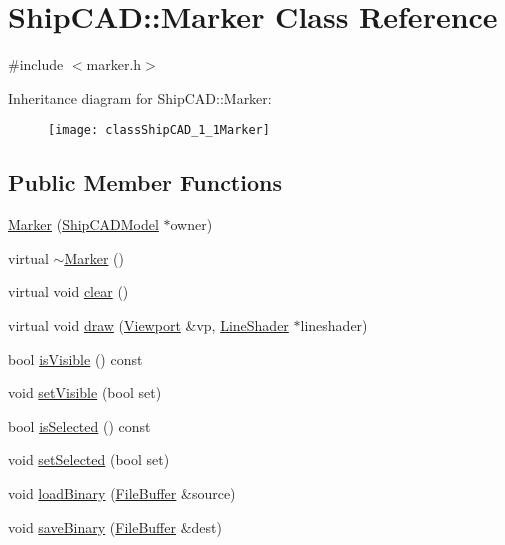 \hypertarget{classShipCAD_1_1Marker}{}\section{Ship\+C\+AD\+:\+:Marker Class Reference}
\label{classShipCAD_1_1Marker}


{\ttfamily \#include $<$marker.\+h$>$}

Inheritance diagram for Ship\+C\+AD\+:\+:Marker\+:\begin{figure}[H]
\begin{center}
\leavevmode
\texttt{[image: classShipCAD\_1\_1Marker]}
\end{center}
\end{figure}
\subsection*{Public Member Functions}
\begin{DoxyCompactItemize}
\item 
\hyperlink{classShipCAD_1_1Marker_a216cf592a0945f6b6923a00c9625e3bf}{Marker} (\hyperlink{classShipCAD_1_1ShipCADModel}{Ship\+C\+A\+D\+Model} $\ast$owner)
\item 
virtual \hyperlink{classShipCAD_1_1Marker_a2f3196a90d442386b0d50f54b69e6116}{$\sim$\+Marker} ()
\item 
virtual void \hyperlink{classShipCAD_1_1Marker_ac7c7eea8648562f3fa00a9e10af6ec97}{clear} ()
\item 
virtual void \hyperlink{classShipCAD_1_1Marker_a0cca647d9b32dc69b03903b024dc3091}{draw} (\hyperlink{classShipCAD_1_1Viewport}{Viewport} \&vp, \hyperlink{classShipCAD_1_1LineShader}{Line\+Shader} $\ast$lineshader)
\item 
bool \hyperlink{classShipCAD_1_1Marker_a505a790bb39356858ecf59513a76ec95}{is\+Visible} () const 
\item 
void \hyperlink{classShipCAD_1_1Marker_af21b0bac028e01ce02ea97bf6f83cccc}{set\+Visible} (bool set)
\item 
bool \hyperlink{classShipCAD_1_1Marker_ab7beb66cda8917ec7bfbc833f9b71071}{is\+Selected} () const 
\item 
void \hyperlink{classShipCAD_1_1Marker_ad3bbb4a01e11e3d2885f56599a77a3d1}{set\+Selected} (bool set)
\item 
void \hyperlink{classShipCAD_1_1Marker_a0f2aa7cd6bae40784c077b89d5ebdb50}{load\+Binary} (\hyperlink{classShipCAD_1_1FileBuffer}{File\+Buffer} \&source)
\item 
void \hyperlink{classShipCAD_1_1Marker_abceb4cbb5b038eb88d0f7f26507be15c}{save\+Binary} (\hyperlink{classShipCAD_1_1FileBuffer}{File\+Buffer} \&dest)
\end{DoxyCompactItemize}
